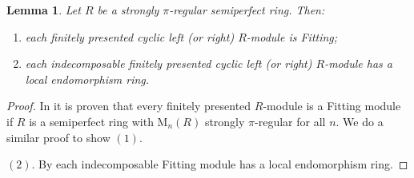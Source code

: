 \documentclass{amsart}
\newtheorem{lemma}[theorem]{Lemma}
\begin{document}
\begin{lemma}
\label{L:Fitting} Let $R$ be a strongly $\pi$-regular semiperfect ring. Then:
\begin{enumerate}
\item each finitely presented cyclic left (or right) $R$-module is Fitting;
\item each indecomposable finitely presented cyclic left (or right) $R$-module has a local endomorphism ring.
\end{enumerate}
\end{lemma}
\begin{proof} In \cite[Lemma 3.21]{Fac98} it is proven that every finitely presented $R$-module is a Fitting module if $R$ is a semiperfect ring with $\mathrm{M}_n(R)$ strongly $\pi$-regular for all $n$. We do a similar proof to show $(1)$.

$(2)$. By \cite[Lemma 2.21]{Fac98} each indecomposable Fitting module has a local endomorphism ring.
\end{proof}
\end{document}
